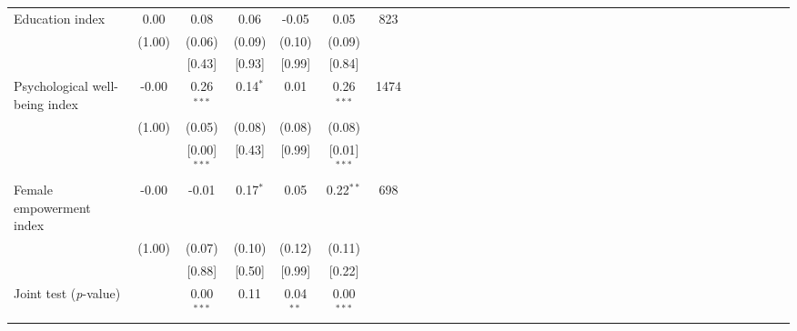 {\begin{tabular}{l*{6}{SSSSSc}}
Education index&     0.00&     0.08&     0.06&    -0.05&     0.05&      823\\
          &   (1.00)&   (0.06)&   (0.09)&   (0.10)&   (0.09)&         \\
          &         &   [0.43]&   [0.93]&   [0.99]&   [0.84]&         \\
Psychological well-being index&    -0.00&0.26$^{***}$&0.14$^{*}$&     0.01&0.26$^{***}$&     1474\\
          &   (1.00)&   (0.05)&   (0.08)&   (0.08)&   (0.08)&         \\
          &         &[0.00]$^{***}$&   [0.43]&   [0.99]&[0.01]$^{***}$&         \\
Female empowerment index&    -0.00&    -0.01&0.17$^{*}$&     0.05&0.22$^{**}$&      698\\
          &   (1.00)&   (0.07)&   (0.10)&   (0.12)&   (0.11)&         \\
          &         &   [0.88]&   [0.50]&   [0.99]&   [0.22]&         \\
\midrule Joint test (\emph{p}-value)&         &0.00$^{***}$&     0.11&0.04$^{**}$&0.00$^{***}$&         \\
\bottomrule
\end{tabular}
}
